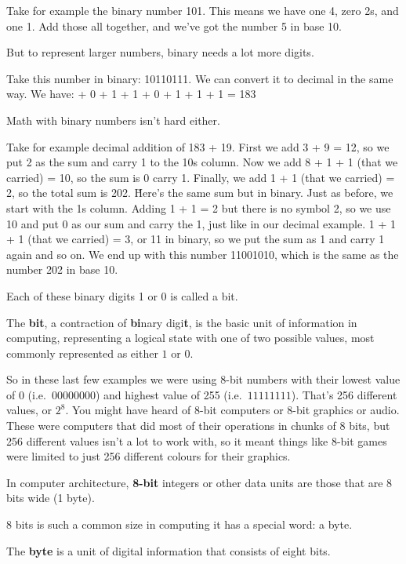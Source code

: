 \be
Take for example the binary number 101. This means we have one 4, zero 2s, and one 1. Add those all together, and
we've got the number 5 in base 10.
\ee

But to represent larger numbers, binary needs a lot more digits.

\be
Take this number in binary: 10110111. We can convert it to decimal in the same way. We have:
 + 0 + 1 + 1 + 0 + 1 +
1 + 1 = 183
\ese
\ee

Math with binary numbers isn't hard either.

\be
Take for example decimal addition of 183 + 19. First we add 3 + 9 = 12, so we put 2 as the sum and carry 1 to the 10s
column. Now we add 8 + 1 + 1 (that we carried) = 10, so the sum is 0 carry 1. Finally, we add 1 + 1 (that we carried)
= 2, so the total sum is 202. \v

Here's the same sum but in binary. Just as before, we start with the 1s column. Adding 1 + 1 = 2 but there is no
symbol 2, so we use 10 and put 0 as our sum and carry the 1, just like in our decimal example. 1 + 1 + 1 (that we
carried) = 3, or 11 in binary, so we put the sum as 1 and carry 1 again and so on. We end up with this number
11001010, which is the same as the number 202 in base 10.
\ee

Each of these binary digits 1 or 0 is called a bit.

\bd[Bit]
The \textbf{bit}, a contraction of \textbf{bi}nary digi\textbf{t}, is the basic unit of information in computing,
representing a logical state with one of two possible values, most commonly represented as either $1$ or $0$.
\ed

So in these last few examples we were using 8-bit numbers with their lowest value of 0 (i.e.\ $00000000$) and highest
value of 255 (i.e.\ $11111111$). That's 256 different values, or $2^8$. You might have heard of 8-bit computers or
8-bit graphics or audio. These were computers that did most of their operations in chunks of 8 bits, but 256
different values isn't a lot to work with, so it meant things like 8-bit games were limited to just 256 different
colours for their graphics.

\bd[8-bit]
In computer architecture, \textbf{8-bit} integers or other data units are those that are 8 bits wide (1 byte).
\ed

8 bits is such a common size in computing it has a special word: a byte.

\bd[Byte]
The \textbf{byte} is a unit of digital information that consists of eight bits.
\ed

